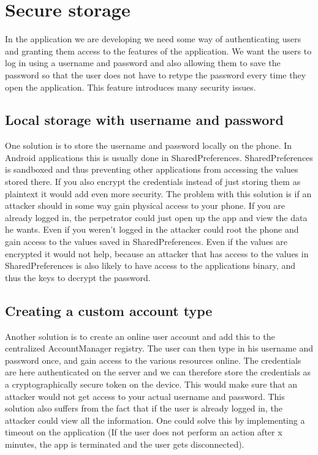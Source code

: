\section{Secure storage}
In the application we are developing we need some way of authenticating users and granting them access to the features of the application. We want the users to log in using a username and password and also allowing them to save the password so that the user does not have to retype the password every time they open the application. This feature introduces many security issues. 

\subsection{Local storage with username and password}
One solution is to store the username and password locally on the phone. In Android applications this is usually done in SharedPreferences. SharedPreferences is sandboxed and thus preventing other applications from accessing the values stored there. If you also encrypt the credentials instead of just storing them as plaintext it would add even more security. 
\newline
\newline
The problem with this solution is if an attacker should in some way gain physical access to your phone. If you are already logged in, the perpetrator could just open up the app and view the data he wants. Even if you weren’t logged in the attacker could root the phone and gain access to the values saved in SharedPreferences. Even if the values are encrypted it would not help, because an attacker that has access to the values in SharedPreferences is also likely to have access to the applications binary, and thus the keys to decrypt the password.

\subsection{Creating a custom account type}
Another solution is to create an online user account and add this to the centralized AccountManager registry. The user can then type in his username and password once, and gain access to the various resources online. The credentials are here authenticated on the server and we can therefore store the credentials as a cryptographically secure token on the device. This would make sure that an attacker would not get access to your actual username and password. 
\newline
\newline
This solution also suffers from the fact that if the user is already logged in, the attacker could view all the information. One could solve this by implementing a timeout on the application (If the user does not perform an action after x minutes, the app is terminated and the user gets disconnected).


